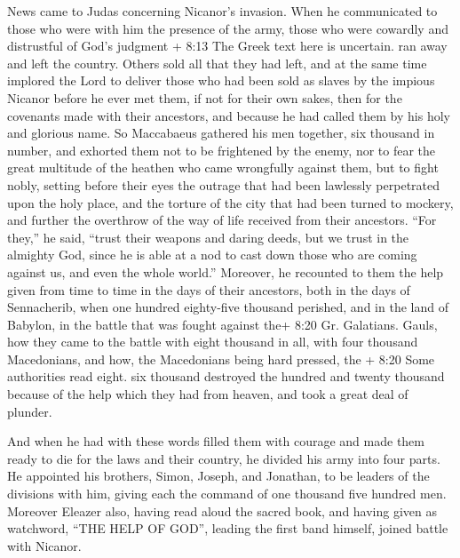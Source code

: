  News came to Judas concerning Nicanor's invasion. When he
communicated to those who were with him the presence of the army,
 those who were cowardly and distrustful of God's judgment
+ 8:13 The Greek text here is uncertain. ran away and left the country.
 Others sold all that they had left, and at the same time
implored the Lord to deliver those who had been sold as slaves by the
impious Nicanor before he ever met them,  if not for their
own sakes, then for the covenants made with their ancestors, and because
he had called them by his holy and glorious name.  So
Maccabaeus gathered his men together, six thousand in number, and
exhorted them not to be frightened by the enemy, nor to fear the great
multitude of the heathen who came wrongfully against them, but to fight
nobly,  setting before their eyes the outrage that had been
lawlessly perpetrated upon the holy place, and the torture of the city
that had been turned to mockery, and further the overthrow of the way of
life received from their ancestors.  ``For they,'' he said,
``trust their weapons and daring deeds, but we trust in the almighty
God, since he is able at a nod to cast down those who are coming against
us, and even the whole world.''  Moreover, he recounted to
them the help given from time to time in the days of their ancestors,
both in the days of Sennacherib, when one hundred eighty-five thousand
perished,  and in the land of Babylon, in the battle that
was fought against the+ 8:20 Gr. Galatians. Gauls, how they came to the
battle with eight thousand in all, with four thousand Macedonians, and
how, the Macedonians being hard pressed, the + 8:20 Some authorities
read eight. six thousand destroyed the hundred and twenty thousand
because of the help which they had from heaven, and took a great deal of
plunder.

 And when he had with these words filled them with courage
and made them ready to die for the laws and their country, he divided
his army into four parts.  He appointed his brothers,
Simon, Joseph, and Jonathan, to be leaders of the divisions with him,
giving each the command of one thousand five hundred men. 
Moreover Eleazer also, having read aloud the sacred book, and having
given as watchword, ``THE HELP OF GOD'', leading the first band himself,
joined battle with Nicanor.

